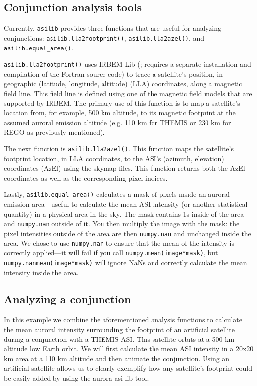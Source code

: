 \documentclass[utf8]{FrontiersinHarvard} %
\begin{document}
\subsection{Conjunction analysis tools}
Currently, \verb|asilib| provides three functions that are useful for analyzing conjunctions: \verb|asilib.lla2footprint()|, \verb|asilib.lla2azel()|, and \verb|asilib.equal_area()|.

\verb|asilib.lla2footprint()| uses IRBEM-Lib (\citet{irbem}; requires a separate installation and compilation of the Fortran source code) to trace a satellite's position, in geographic (latitude, longitude, altitude) (LLA) coordinates, along a magnetic field line. This field line is defined using one of the magnetic field models that are supported by IRBEM. The primary use of this function is to map a satellite's location from, for example, 500 km altitude, to its magnetic footprint at the assumed auroral emission altitude (e.g. 110 km for THEMIS or 230 km for REGO as previously mentioned).

The next function is \verb|asilib.lla2azel()|. This function maps the satellite's footprint location, in LLA coordinates, to the ASI's (azimuth, elevation) coordinates (AzEl) using the skymap files. This function returns both the AzEl coordinates as well as the corresponding pixel indices.

Lastly, \verb|asilib.equal_area()| calculates a mask of pixels inside an auroral emission area---useful to calculate the mean ASI intensity (or another statistical quantity) in a physical area in the sky. The mask contains 1s inside of the area and \verb|numpy.nan| outside of it. You then multiply the image with the mask: the pixel intensities outside of the area are then \verb|numpy.nan| and unchanged inside the area. We chose to use \verb|numpy.nan| to ensure that the mean of the intensity is correctly applied---it will fail if you call \verb|numpy.mean(image*mask)|, but \verb|numpy.nanmean(image*mask)| will ignore NaNs and correctly calculate the mean intensity inside the area.

\subsection{Analyzing a conjunction}\label{satellite_conjunction}
In this example we combine the aforementioned analysis functions to calculate the mean auroral intensity surrounding the footprint of an artificial satellite during a conjunction with a THEMIS ASI. This satellite orbits at a 500-km altitude low Earth orbit. We will first calculate the mean ASI intensity in a 20x20 km area at a 110 km altitude and then animate the conjunction. Using an artificial satellite allows us to clearly exemplify how any satellite's footprint could be easily added by using the aurora-asi-lib tool. 
\end{document}
